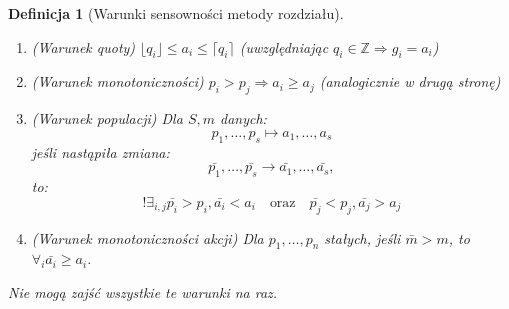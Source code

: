 \documentclass[12pt,a4paper]{article}
\theoremstyle{break}
\newtheorem{definition}{Definicja}[section]
\begin{document}
	\begin{definition}[Warunki sensowności metody rozdziału]
		\begin{enumerate}[1.]
			\item (Warunek quoty) $\lfloor q_i \rfloor \leq a_i \leq \lceil q_i \rceil$ (uwzględniając $q_i \in \mathbb{Z} \Rightarrow g_i = a_i$)
			\item (Warunek monotoniczności) $p_i > p_j \Rightarrow a_i \geq a_j$ (analogicznie w drugą stronę)
			\item (Warunek populacji) Dla $S, m$ danych:
			\[
			p_1, \dots, p_s \longmapsto a_1, \dots, a_s
			\]
			jeśli nastąpiła zmiana:
			\[
			\bar{p_1}, \dots, \bar{p_s} \longrightarrow \bar{a_1}, \dots, \bar{a_s},
			\]
			to:
			\[
			!\exists_{i,j} \bar{p_i}>p_i, \bar{a_i}<a_i \quad \text{oraz} \quad \bar{p_j}<p_j, \bar{a_j}>a_j
			\]
			\item (Warunek monotoniczności akcji) Dla $p_1,\dots,p_n$ stałych, jeśli $\bar{m}>m$, to $\forall_i \bar{a_i} \geq a_i$.
		\end{enumerate}
		Nie mogą zajść wszystkie te warunki na raz.
	\end{definition}
	
\end{document}
